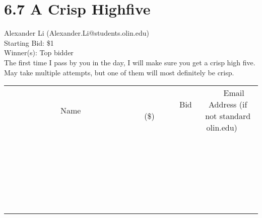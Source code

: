 \documentclass[11pt]{article}
\begin{document}
\section*{6.7 A Crisp Highfive}
Alexander Li (Alexander.Li@students.olin.edu) \\
Starting Bid: \$1 \\
Winner(s): 
Top bidder \\
The first time I pass by you in the day, I will make sure you get a crisp high five. May take multiple attempts, but one of them will most definitely be crisp. \\[6ex]
\begin{tabular}{c c c}
~~~~~~~~~~~~~Name~~~~~~~~~~~~~ & ~~~~~~~~~Bid (\$)~~~~~~~~~ & ~~~Email Address (if not standard olin.edu)~~~ \\
 & & \\
\hline
 & & \\
\hline
 & & \\
\hline
 & & \\
\hline
 & & \\
\hline
 & & \\
\hline
 & & \\
\hline
 & & \\
\hline
 & & \\
\hline
 & & \\
\hline
 & & \\
\hline
 & & \\
\hline
 & & \\
\hline
 & & \\
\hline
 & & \\
\hline
 & & \\
\hline
 & & \\
\hline
 & & \\
\hline
 & & \\
\hline
 & & \\
\hline
 & & \\
\hline
 & & \\
\hline
 & & \\
\hline
 & & \\
\hline
 & & \\
\hline
 & & \\
\hline
\end{tabular}
\clearpage
\end{document}

